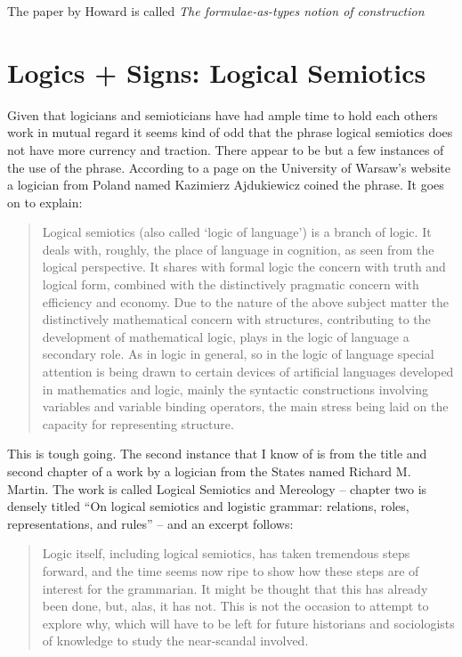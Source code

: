 \documentclass[dah,phd,a4paper]{xe_uccthesis}
\newcommand{\work}[1] {\textit{#1}}
\begin{document}
The paper by Howard is called \work{The formulae-as-types notion of construction}\citep{howard_formulae-as-types_1980}

\section{Logics + Signs: Logical Semiotics}

Given that logicians and semioticians have had ample time to hold each others work in mutual regard it seems kind of odd that the phrase logical semiotics does not have more currency and traction. There appear to be but a few instances of the use of the phrase. According to a page on the University of Warsaw's website a logician from Poland named Kazimierz Ajdukiewicz coined the phrase. It goes on to explain:

\begin{quotation}
Logical semiotics (also called ‘logic of language’) is a branch of logic. It deals with, roughly, the place of language in cognition, as seen from the logical perspective. It shares with formal logic the concern with truth and logical form, combined with the distinctively pragmatic concern with efficiency and economy. Due to the nature of the above subject matter the distinctively mathematical concern with structures, contributing to the development of mathematical logic, plays in the logic of language a secondary role. As in logic in general, so in the logic of language special attention is being drawn to certain devices of artificial languages developed in mathematics and logic, mainly the syntactic constructions involving variables and variable binding operators, the main stress being laid on the capacity for representing structure.
\end{quotation}

This is tough going. The second instance that I know of is from the title and second chapter of a work by a logician from the States named Richard M. Martin. The work is called Logical Semiotics and Mereology – chapter two is densely titled “On logical semiotics and logistic grammar: relations, roles, representations, and rules” – and an excerpt follows:

\begin{quotation}
Logic itself, including logical semiotics, has taken tremendous steps forward, and the time seems now ripe to show how these steps are of interest for the grammarian. It might be thought that this has already been done, but, alas, it has not. This is not the occasion to attempt to explore why, which will have to be left for future historians and sociologists of knowledge to study the near-scandal involved.
\end{quotation}
\end{document}
